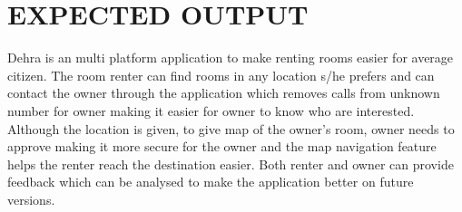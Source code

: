 \chapter{EXPECTED OUTPUT}
Dehra is an multi platform application to make renting rooms easier for average citizen. The room renter can find rooms in any location s/he prefers and can contact the owner through the application which removes calls from unknown number for owner making it easier for owner to know who are interested. Although the location is given, to give map of the owner's room, owner needs to approve making it more secure for the owner and the map navigation feature helps the renter reach the destination easier. Both renter and owner can provide feedback which can be analysed to make the application better on future versions.